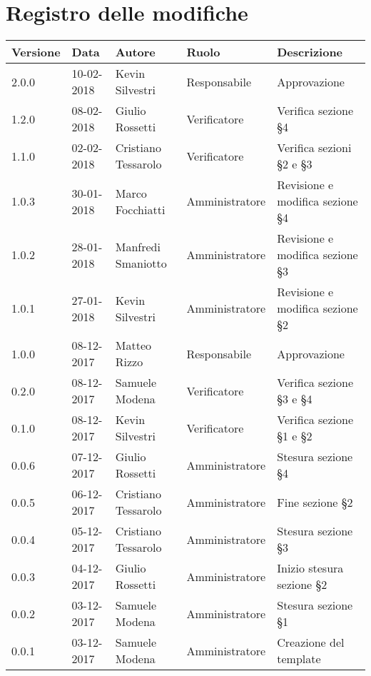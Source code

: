 \documentclass[./NormediProgetto.tex]{subfiles}
\begin{document}
\chapter*{Registro delle modifiche}
\setlength\LTleft{-22mm}
\begin{longtable}{|p{20mm}|p{20mm}|p{40mm}|p{30mm}|p{50mm}|}
	\hline
	\textbf{Versione} & \textbf{Data} & \textbf{Autore} & \textbf{Ruolo} & \textbf{Descrizione} \\ \hline 
		2.0.0 & 10-02-2018 & Kevin Silvestri & Responsabile & Approvazione\\ \hline
		1.2.0 & 08-02-2018 & Giulio Rossetti & Verificatore & Verifica sezione §4\\ \hline  
		1.1.0 & 02-02-2018 & Cristiano Tessarolo & Verificatore & Verifica sezioni §2 e §3\\ \hline 
		1.0.3 & 30-01-2018 & Marco Focchiatti & Amministratore & Revisione e modifica sezione §4\\ \hline 
		1.0.2 & 28-01-2018 & Manfredi Smaniotto & Amministratore & Revisione e modifica sezione §3\\ \hline 
		1.0.1 & 27-01-2018 & Kevin Silvestri & Amministratore & Revisione e modifica sezione §2\\ \hline 
		1.0.0 & 08-12-2017 & Matteo Rizzo & Responsabile & Approvazione\\ \hline
		0.2.0 & 08-12-2017 & Samuele Modena & Verificatore & Verifica sezione §3 e §4\\ \hline
		0.1.0 & 08-12-2017 & Kevin Silvestri & Verificatore & Verifica sezione §1 e §2\\ \hline
		0.0.6 & 07-12-2017 & Giulio Rossetti & Amministratore & Stesura sezione §4\\ \hline
		0.0.5 & 06-12-2017 & Cristiano Tessarolo & Amministratore & Fine sezione §2\\ \hline
		0.0.4 & 05-12-2017 & Cristiano Tessarolo & Amministratore & Stesura sezione §3\\ \hline
		0.0.3 & 04-12-2017 & Giulio Rossetti & Amministratore & Inizio stesura sezione §2\\ \hline
		0.0.2 & 03-12-2017 & Samuele Modena & Amministratore & Stesura sezione §1\\ \hline
		0.0.1 & 03-12-2017 & Samuele Modena & Amministratore & Creazione del template\\ \hline
\end{longtable}
\end{document}
